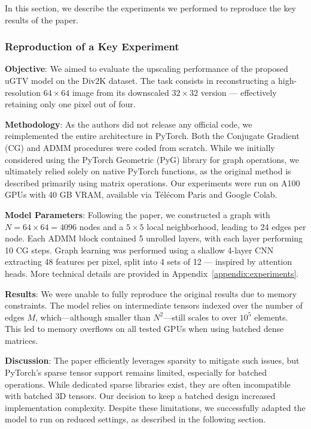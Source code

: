 \documentclass{article}
\theoremstyle{plain}
\theoremstyle{definition}
\theoremstyle{remark}
\begin{document}
In this section, we describe the experiments we performed to reproduce the key results of the paper.

\subsubsection{Reproduction of a Key Experiment}


\textbf{Objective}: We aimed to evaluate the upscaling performance of the proposed uGTV model on the Div2K dataset. The task consists in reconstructing a high-resolution $64\times64$ image from its downscaled $32\times32$ version — effectively retaining only one pixel out of four.

\textbf{Methodology}: As the authors did not release any official code, we reimplemented the entire architecture in PyTorch. Both the Conjugate Gradient (CG) and ADMM procedures were coded from scratch. While we initially considered using the PyTorch Geometric (PyG) library for graph operations, we ultimately relied solely on native PyTorch functions, as the original method is described primarily using matrix operations. Our experiments were run on A100 GPUs with 40 GB VRAM, available via Télécom Paris and Google Colab.

\textbf{Model Parameters}: Following the paper, we constructed a graph with $N = 64 \times 64 = 4096$ nodes and a $5 \times 5$ local neighborhood, leading to 24 edges per node. Each ADMM block contained 5 unrolled layers, with each layer performing 10 CG steps. Graph learning was performed using a shallow 4-layer CNN extracting 48 features per pixel, split into 4 sets of 12 — inspired by attention heads. More technical details are provided in Appendix~\ref{appendix:experiments}.

\textbf{Results}: We were unable to fully reproduce the original results due to memory constraints. The model relies on intermediate tensors indexed over the number of edges $M$, which—although smaller than $N^2$—still scales to over $10^5$ elements. This led to memory overflows on all tested GPUs when using batched dense matrices.

\textbf{Discussion}: The paper efficiently leverages sparsity to mitigate such issues, but PyTorch’s sparse tensor support remains limited, especially for batched operations. While dedicated sparse libraries exist, they are often incompatible with batched 3D tensors. Our decision to keep a batched design increased implementation complexity. Despite these limitations, we successfully adapted the model to run on reduced settings, as described in the following section.
\end{document}
